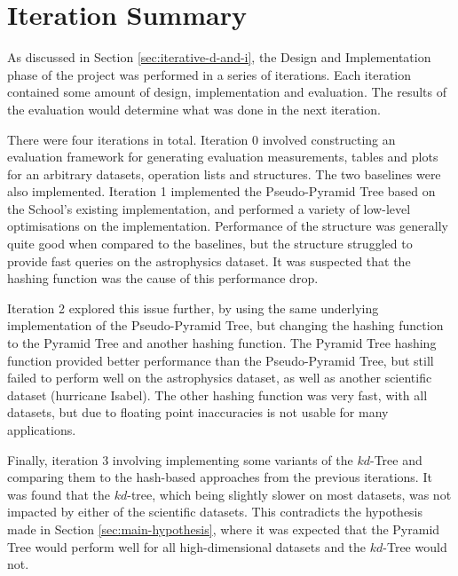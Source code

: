 \section{Iteration Summary}

As discussed in Section \ref{sec:iterative-d-and-i}, the Design and Implementation phase of the project was performed in a series of iterations. Each iteration contained some amount of design, implementation and evaluation. The results of the evaluation would determine what was done in the next iteration.

There were four iterations in total. Iteration 0 involved constructing an evaluation framework for generating evaluation measurements, tables and plots for an arbitrary datasets, operation lists and structures. The two baselines were also implemented. Iteration 1 implemented the Pseudo-Pyramid Tree based on the School's existing implementation, and performed a variety of low-level optimisations on the implementation. Performance of the structure was generally quite good when compared to the baselines, but the structure struggled to provide fast queries on the astrophysics dataset. It was suspected that the hashing function was the cause of this performance drop.

Iteration 2 explored this issue further, by using the same underlying implementation of the Pseudo-Pyramid Tree, but changing the hashing function to the Pyramid Tree and another hashing function. The Pyramid Tree hashing function provided better performance than the Pseudo-Pyramid Tree, but still failed to perform well on the astrophysics dataset, as well as another scientific dataset (hurricane Isabel). The other hashing function was very fast, with all datasets, but due to floating point inaccuracies is not usable for many applications.

Finally, iteration 3 involving implementing some variants of the $kd$-Tree and comparing them to the hash-based approaches from the previous iterations. It was found that the $kd$-tree, which being slightly slower on most datasets, was not impacted by either of the scientific datasets. This contradicts the hypothesis made in Section \ref{sec:main-hypothesis}, where it was expected that the Pyramid Tree would perform well for all high-dimensional datasets and the $kd$-Tree would not.